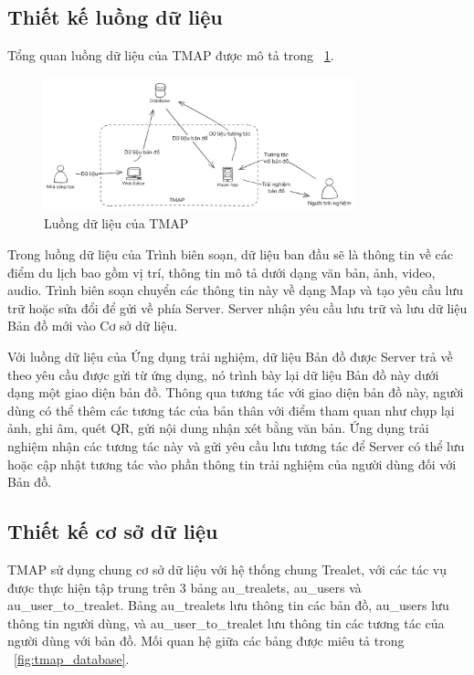 \subsection{Thiết kế luồng dữ liệu}
Tổng quan luồng dữ liệu của TMAP được mô tả trong \figurename~\ref{fig:tmap_dataflow}.

\begin{figure}[h]
    \centering
    \includegraphics[width=0.8\textwidth]{figures/dataflow.png}
    \caption{Luồng dữ liệu của TMAP}
    \label{fig:tmap_dataflow}
\end{figure}

Trong luồng dữ liệu của Trình biên soạn, dữ liệu ban đầu sẽ là thông tin về các
điểm du lịch bao gồm vị trí, thông tin mô tả dưới dạng văn bản, ảnh, video, audio.
Trình biên soạn chuyển các thông tin này về dạng Map và tạo yêu cầu lưu trữ hoặc
sửa đổi để gửi về phía Server. Server nhận yêu cầu lưu trữ và lưu dữ liệu Bản đồ mới
vào Cơ sở dữ liệu.

Với luồng dữ liệu của Ứng dụng trải nghiệm, dữ liệu Bản đồ được Server trả
về theo yêu cầu được gửi từ ứng dụng, nó trình bày lại dữ liệu Bản đồ này dưới dạng một giao diện bản đồ. Thông qua tương tác với giao diện bản đồ này, người dùng có
thể thêm các tương tác của bản thân với điểm tham quan như chụp lại ảnh, ghi âm,
quét QR, gửi nội dung nhận xét bằng văn bản. Ứng dụng trải nghiệm nhận các tương
tác này và gửi yêu cầu lưu tương tác để Server có thể lưu hoặc cập nhật tương tác vào
phần thông tin trải nghiệm của người dùng đối với Bản đồ.

\subsection{Thiết kế cơ sở dữ liệu}
TMAP sử dụng chung cơ sở dữ liệu với hệ thống chung Trealet, với các tác vụ được thực hiện tập trung trên 3 bảng au\_trealets, au\_users và au\_user\_to\_trealet.
Bảng au\_trealets lưu thông tin các bản đồ, au\_users lưu thông tin người dùng, và
au\_user\_to\_trealet lưu thông tin các tương tác của người dùng với bản đồ. Mối quan
hệ giữa các bảng được miêu tả trong \figurename~\ref{fig:tmap_database}.


